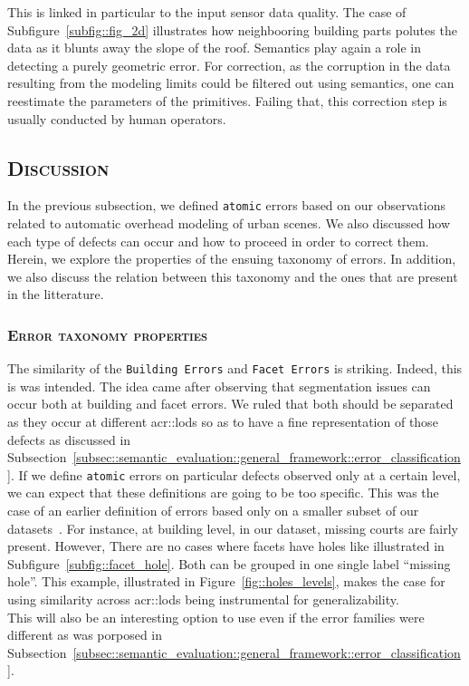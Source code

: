                 This is linked in particular to the input sensor data quality.
                The case of Subfigure~\ref{subfig::fig_2d} illustrates how neighbooring building parts polutes the data as it blunts away the slope of the roof.
                Semantics play again a role in detecting a purely geometric error.
                For correction, as the corruption in the data resulting from the modeling limits could be filtered out using semantics, one can reestimate the parameters of the primitives.
                Failing that, this correction step is usually conducted by human operators.

    \subsection{\textsc{Discussion}}
        \label{subsec::semantic_evaluation::overhead::discussion}

        In the previous subsection, we defined \texttt{atomic} errors based on our observations related to automatic overhead modeling of urban scenes.
        We also discussed how each type of defects can occur and how to proceed in order to correct them.
        Herein, we explore the properties of the ensuing taxonomy of errors.
        In addition, we also discuss the relation between this taxonomy and the ones that are present in the litterature.

        \subsubsection{\textsc{Error taxonomy properties}}
            The similarity of the \texttt{Building Errors} and \texttt{Facet Errors} is striking.
            Indeed, this is was intended.
            The idea came after observing that segmentation issues can occur both at building and facet errors.
            We ruled that both should be separated as they occur at different \glspl{acr::lod} so as to have a fine representation of those defects as discussed in Subsection~\ref{subsec::semantic_evaluation::general_framework::error_classification}.
            If we define \texttt{atomic} errors on particular defects observed only at a certain level, we can expect that these definitions are going to be too specific.
            This was the case of an earlier definition of errors based only on a smaller subset of our datasets~\parencite{ennafii2018semantic}.
            For instance, at building level, in our dataset, missing courts are fairly present.
            However, There are no cases where facets have holes like illustrated in Subfigure~\ref{subfig::facet_hole}.
            Both can be grouped in one single label ``missing hole''.
            This example, illustrated in Figure~\ref{fig::holes_levels}, makes the case for using similarity across \glspl{acr::lod} being instrumental for generalizability.\\
            This will also be an interesting option to use even if the error families were different as was porposed in Subsection~\ref{subsec::semantic_evaluation::general_framework::error_classification}.\\

